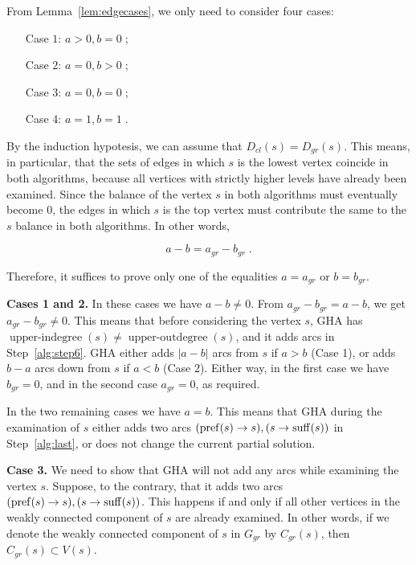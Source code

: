 From Lemma~\ref{lem:edgecases}, we only need to consider four cases:
\begin{enumerate}
\item[Case $1$:] $ a> 0, b = 0\; $;
\item[Case $2$:] $ a = 0, b> 0\; $;
\item[Case $3$:] $ a = 0, b = 0\; $;
\item[Case $4$:] $ a = 1, b = 1\; $.
\end{enumerate}

By the induction hypotesis, we can assume that $ D_{cl} (s) = D_{gr} (s) $. This means, in particular, that the sets of edges in which $ s $ is the lowest vertex coincide in both algorithms, because all vertices with strictly higher levels have already been examined. Since the balance of the vertex $s$ in both algorithms must eventually become $ 0 $, the edges in which $ s $ is the top vertex must contribute the same to the $ s $ balance in both algorithms. In other words,

\begin{equation}
\label{eqn:balance}
    a-b = a_{gr}-b_{gr} \; .
\end{equation}

Therefore, it suffices to prove only one of the equalities $ a = a_{gr} $ or $ b = b_{gr} $.

\textbf {Cases 1 and 2.} In these cases we have $a-b\ne 0$. From $ a_{gr} - b_{gr} = a-b$, we get $ a_{gr} - b_{gr}\ne 0$. This means that before considering the vertex $s$, GHA has $\operatorname{upper-indegree}(s) \neq \operatorname{upper-outdegree}(s)$, and it adds arcs in Step~\ref{alg:step6}. GHA either adds $|a-b| $ arcs from $ s $ if $ a> b $ (Case 1), or adds $ b-a$ arcs down from $ s $ if $ a <b $ (Case 2). Either way, in the first case we have $ b_{gr} = 0 $, and in the second case $ a_{gr} = 0 $, as required.

In the two remaining cases we have $a=b$. This means that GHA during the examination of $ s $ either adds two arcs $ (\operatorname{pref} (s) \to s), (s \to \operatorname{suff} (s)) $ in Step~\ref{alg:last}, or does not change the current partial solution.

\textbf {Case 3.} We need to show that GHA will not add any arcs while examining the vertex $ s $. Suppose, to the contrary, that it adds two arcs $ (\operatorname{pref} (s) \to s), (s \to \operatorname{suff} (s)) $. This happens if and only if all other vertices in the weakly connected component of $ s $ are already examined. In other words, if we denote the weakly connected component of $ s $ in $ G_{gr} $ by $ C_{gr} (s) $, then $ C_{gr} (s) \subset V (s) $.

